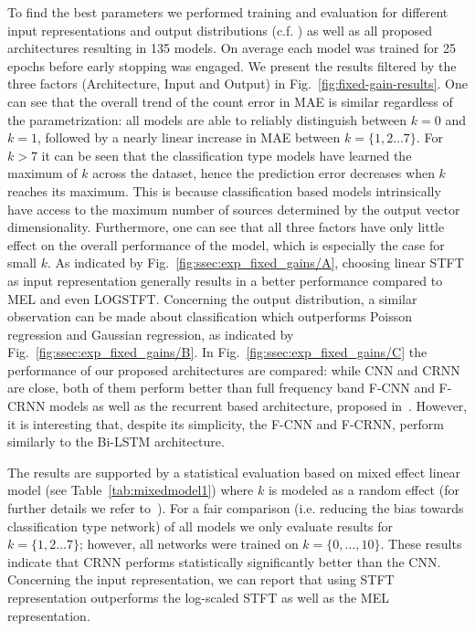 To find the best parameters we performed training and evaluation for different input representations and output distributions (c.f. \cite{stoeter17}) as well as all proposed architectures resulting in 135 models.
On average each model was trained for 25 epochs before early stopping was engaged.
We present the results filtered by the three factors (Architecture, Input and Output) in Fig.~\ref{fig:fixed-gain-results}.
One can see that the overall trend of the count error in MAE is similar regardless of the parametrization: all models are able to reliably distinguish between \(k=0\) and \(k=1\), followed by a nearly linear increase in MAE between \(k=\{1, 2\dots7\}\).
For \(k > 7\) it can be seen that the classification type models have learned the maximum of \(k\) across the dataset, hence the prediction error decreases when \(k\) reaches its maximum.
This is because classification based models intrinsically have access to the maximum number of sources determined by the output vector dimensionality.
Furthermore, one can see that all three factors have only little effect on the overall performance of the model, which is especially the case for small \(k\).
As indicated by Fig.~\ref{fig:ssec:exp_fixed_gains/A}, choosing linear STFT as input representation generally results in a better performance compared to MEL and even LOGSTFT.
Concerning the output distribution, a similar observation can be made about classification which outperforms Poisson regression and Gaussian regression, as indicated by Fig.~\ref{fig:ssec:exp_fixed_gains/B}.
In Fig.~\ref{fig:ssec:exp_fixed_gains/C} the performance of our proposed architectures are compared:
while CNN and CRNN are close, both of them perform better than full frequency band F-CNN and F-CRNN models as well as the recurrent based architecture, proposed in~\cite{stoeter17}.
However, it is interesting that, despite its simplicity, the F-CNN and F-CRNN, perform similarly to the Bi-LSTM architecture.
\par
The results are supported by a statistical evaluation based on mixed effect linear model (see Table~\ref{tab:mixedmodel1}) where \(k\) is modeled as a random effect (for further details we refer to~\cite{Mcculloch06}).
For a fair comparison (i.e. reducing the bias towards classification type network) of all models we only evaluate results for \(k = \{1, 2\dots7\}\); however, all networks were trained on \(k = \{0, \dots, 10\}\).
These results indicate that CRNN performs statistically significantly better than the CNN.\@
Concerning the input representation, we can report that using STFT representation outperforms the log-scaled STFT as well as the MEL representation.
